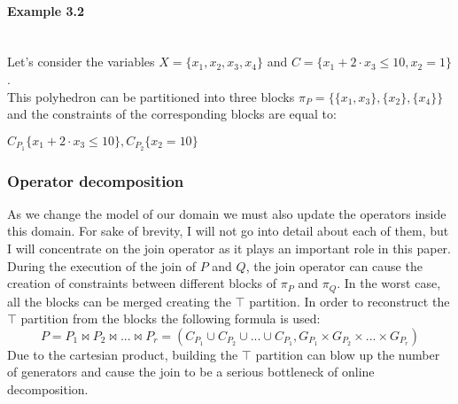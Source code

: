  
\paragraph{Example 3.2} \mbox{}\\
Let's consider the variables $X = \{x_1,x_2,x_3,x_4\}$ and $C = \{ x_1 + 2 \cdot x_3 \leq 10, x_2 = 1 \}$.\\
This polyhedron can be partitioned into three blocks $\pi_P = \{\{x_1,x_3\},\{x_2\},\{x_4\}\}$ and the constraints of the corresponding blocks are equal to: 
\begin{center}
	$C_{P_1}\{x_1 + 2\cdot x_3 \leq 10 \} , C_{P_2}\{x_2 = 10 \}$
\end{center}


\subsubsection{Operator decomposition}
As we change the model of our domain we must also update the operators inside this domain. For sake of brevity, I will not go into detail about each of them, but I will concentrate on the join operator as it plays an important role in this paper.\\
During the execution of the join of $P$ and $Q$, the join operator can cause the creation of constraints between different blocks of $\pi_P$ and $\pi_Q$. In the worst case, all the blocks can be merged creating the $\top$ partition. In order to reconstruct the $\top$ partition from the blocks the following formula is used:
\begin{equation}
    P = P_1 \Join P_2 \Join ... \Join P_r = (C_{P_1} \cup C_{P_2} \cup ... \cup C_{P_1}, G_{P_1} \times G_{P_2} \times  ... \times   G_{P_r})
\end{equation}
Due to the cartesian product, building the $\top$ partition can blow up the number of generators and cause the join to be a serious bottleneck of online decomposition.

